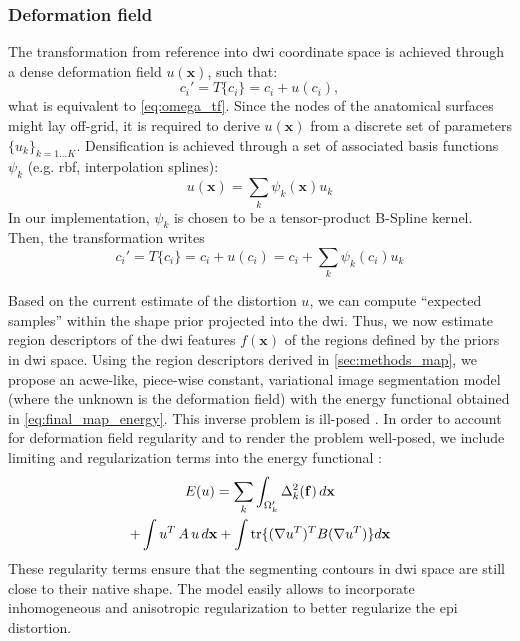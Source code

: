 \subsubsection{Deformation field}
\label{sec:deformation_field}
The transformation from reference into \gls{dwi} coordinate space is 
achieved through a dense deformation field $u(\mathbf{x})$, such that:
\begin{equation}
c_i' = T\{c_i\} = c_i + u(c_i),
\end{equation}
what is equivalent to \eqref{eq:omega_tf}. Since the nodes of the anatomical 
surfaces might lay off-grid, it is required to derive $u(\mathbf{x})$ from a discrete 
set of parameters $\{u_k\}_{k=1 \ldots K}$. Densification is achieved through 
a set of associated basis functions $\psi_k$ (e.g. rbf, interpolation splines):
%
\begin{equation}
u(\mathbf{x}) = \sum_k \psi_k(\mathbf{x}) u_k
\end{equation}
%
In our implementation, $\psi_k$ is chosen to be a tensor-product B-Spline kernel.
Then, the transformation writes
%
\begin{equation}
\label{eq:transformation}
c_i' = T\{c_i\} = c_i + u(c_i) = c_i + \sum_k \psi_k(c_i)u_k
\end{equation} 

Based on the current estimate of the distortion $u$, we can compute 
``expected samples'' within the shape prior projected into the \gls{dwi}.
Thus, we now estimate region descriptors of the \gls{dwi} features 
$f(\mathbf{x})$ of the regions defined by the priors in \gls{dwi} space.
%
Using the region descriptors derived in \autoref{sec:methods_map}, we propose
an \gls{acwe}-like, piece-wise constant, variational image segmentation
model (where the unknown is the deformation field)
\cite{chan_active_2001} with the energy functional obtained in 
\eqref{eq:final_map_energy}. This inverse problem is ill-posed
\cite{bertero_ill-posed_1988,hadamard_sur_1902}.
In order to account for deformation field regularity and to render the 
problem well-posed, we include limiting and regularization terms into 
the energy functional \cite{morozov_linear_1975,tichonov_solution_1963}:
%
\begin{multline}
E(u) = \sum\limits_k \int_{\Omega'_k} \Delta^2_k (\mathbf{f}) \,d\mathbf{x} \\
+ \int u^T \, A \, u \, d\mathbf{x} + \int \tr\{(\nabla u^T)^T B (\nabla u^T)\} d\mathbf{x}
\label{eq:complete_energy}
\end{multline}
%
These regularity terms ensure that the segmenting contours in 
\gls{dwi} space are still close to their native shape. The model
easily allows to incorporate inhomogeneous and anisotropic 
regularization \cite{nagel_investigation_1986} to better regularize
the \gls{epi} distortion. \\
%

